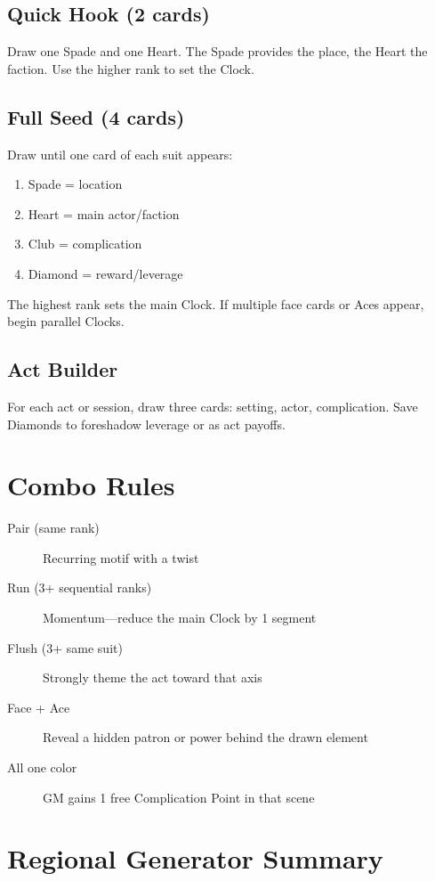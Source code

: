 \subsection{Quick Hook (2 cards)}
Draw one Spade and one Heart. The Spade provides the place, the Heart the faction. Use the higher rank to set the Clock.

\subsection{Full Seed (4 cards)}
Draw until one card of each suit appears:
\begin{enumerate}
\item Spade = location
\item Heart = main actor/faction
\item Club = complication
\item Diamond = reward/leverage
\end{enumerate}

The highest rank sets the main Clock. If multiple face cards or Aces appear, begin parallel Clocks.

\subsection{Act Builder}
For each act or session, draw three cards: setting, actor, complication. Save Diamonds to foreshadow leverage or as act payoffs.

\section{Combo Rules}

\begin{description}
\item[Pair (same rank)] Recurring motif with a twist
\item[Run (3+ sequential ranks)] Momentum---reduce the main Clock by 1 segment
\item[Flush (3+ same suit)] Strongly theme the act toward that axis
\item[Face + Ace] Reveal a hidden patron or power behind the drawn element
\item[All one color] GM gains 1 free Complication Point in that scene
\end{description}

\section{Regional Generator Summary}

